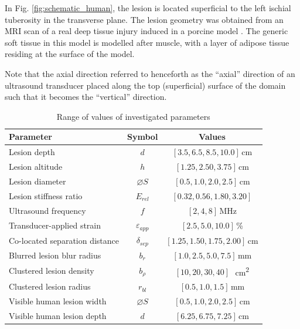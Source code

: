 		In Fig. \ref{fig:schematic_human}, the lesion is located superficial to the left ischial tuberosity in the transverse plane. The lesion geometry was obtained from an MRI scan of a real deep tissue injury induced in a porcine model \cite{solis13}. The generic soft tissue in this model is modelled after muscle, with a layer of adipose tissue residing at the surface of the model.

		Note that the axial direction referred to henceforth as the ``axial'' direction of an ultrasound transducer placed along the top (superficial) surface of the domain such that it becomes the ``vertical'' direction.

		\begin{table}[!htb]
			\centering
			\caption[Quasi-static model investigated parameters]{Range of values of investigated parameters}
			\label{tab:quasi-parametervalues}
			\begin{tabular}{lcc}
				\toprule
				Parameter & Symbol & Values \\
				\midrule
				Lesion depth & $d$ & $[3.5, 6.5, 8.5, 10.0]$\,\si{\cm} \\
				Lesion altitude & $h$ & $[1.25, 2.50, 3.75]$\,\si{\cm} \\
				Lesion diameter & $\diameter S$ & $[0.5, 1.0, 2.0, 2.5]$\,\si{\cm} \\
				Lesion stiffness ratio & $E_{rel}$ & $[0.32, 0.56, 1.80, 3.20]$ \\
				Ultrasound frequency & $f$ & $[2, 4, 8]$\,\si{\MHz} \\
				Transducer-applied strain & $\varepsilon_{app}$ & $[2.5, 5.0, 10.0]$\,\si{\percent} \\
				Co-located separation distance & $\delta_{sep}$ & $[1.25, 1.50, 1.75, 2.00]$\,\si{\cm} \\
				Blurred lesion blur radius & $b_r$ & $[1.0, 2.5, 5.0, 7.5]$\,\si{\mm} \\
				Clustered lesion density & $b_\rho$ & $[10, 20, 30, 40]$\,\si{\per\cm\squared} \\
				Clustered lesion radius & $r_{bl}$ & $[0.5, 1.0, 1.5]$\,\si{\mm} \\
				Visible human lesion width & $\diameter S$ & $[0.5, 1.0, 2.0, 2.5]$\,\si{\cm} \\
				Visible human lesion depth & $d$ & $[6.25, 6.75, 7.25]$\,\si{\cm} \\
				\bottomrule
			\end{tabular}
		\end{table}


